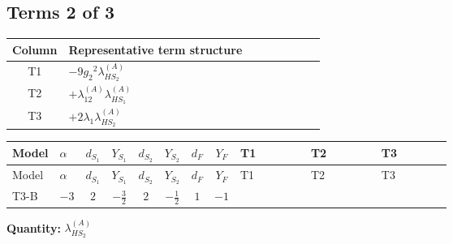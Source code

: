 \documentclass[8pt]{article}
\begin{document}
\begin{landscape}
\subsection*{Terms 2 of 3}
\begin{center}
\begin{tabular}{@{}c >{\raggedright\arraybackslash}p{0.82\linewidth}@{}}
\toprule
Column & Representative term structure \\
\midrule
T1 & \(\displaystyle -9 {g_2}^2 {\lambda_{HS_2}^{(A)}}\) \\
\midrule
T2 & \(\displaystyle +{\lambda_{12}^{(A)}} {\lambda_{HS_1}^{(A)}}\) \\
\midrule
T3 & \(\displaystyle +2 {\lambda_1} {\lambda_{HS_2}^{(A)}}\) \\
\midrule
\bottomrule
\end{tabular}
\end{center}
\smallskip
\tiny
\begin{longtable}{@{}llcccccc >{\raggedright\arraybackslash}p{0.21\linewidth} >{\raggedright\arraybackslash}p{0.21\linewidth} >{\raggedright\arraybackslash}p{0.21\linewidth}@{}}
\toprule
Model & $\alpha$ & $d_{S_1}$ & $Y_{S_1}$ & $d_{S_2}$ & $Y_{S_2}$ & $d_F$ & $Y_F$ & T1 & T2 & T3 \\
\midrule
\endfirsthead
\toprule
Model & $\alpha$ & $d_{S_1}$ & $Y_{S_1}$ & $d_{S_2}$ & $Y_{S_2}$ & $d_F$ & $Y_F$ & T1 & T2 & T3 \\
\midrule
\endhead
T3-B & $-3$ & $2$ & $-\frac{3}{2}$ & $2$ & $-\frac{1}{2}$ & $1$ & $-1$ & \scriptsize\adjustbox{max width=\linewidth}{$\begin{gathered} -9 {g_2}^2 {\lambda_{HS_2}^{(A)}}\end{gathered}$} & \scriptsize\adjustbox{max width=\linewidth}{$\begin{gathered} +{\lambda_{12}^{(A)}} {\lambda_{HS_1}^{(A)}}\end{gathered}$} & \scriptsize\adjustbox{max width=\linewidth}{$\begin{gathered} +2 {\lambda_1} {\lambda_{HS_2}^{(A)}}\end{gathered}$} \\
\midrule
\bottomrule
\end{longtable}
\clearpage
\noindent\textbf{Quantity: }$\lambda_{HS_2}^{(A)}$\par\smallskip

\end{landscape}
\end{document}
